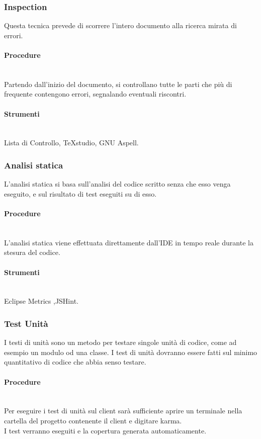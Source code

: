 \subsubsection{Inspection}
Questa tecnica prevede di scorrere l'intero documento alla ricerca mirata di errori.
\paragraph{Procedure} \hfill \\

Partendo dall'inizio del documento, si controllano tutte le parti che più di frequente contengono errori, segnalando eventuali riscontri.
\paragraph{Strumenti} \hfill \\

Lista di Controllo, TeXstudio, GNU Aspell.


\subsubsection{Analisi statica}
L'analisi statica si basa sull'analisi del codice scritto senza che esso venga eseguito, e sul risultato di test eseguiti su di esso.

\paragraph{Procedure} \hfill \\
L'analisi statica viene effettuata direttamente dall'IDE in tempo reale durante la stesura del codice.
\paragraph{Strumenti} \hfill \\
Eclipse Metrics ,JSHint.



\subsubsection{Test Unità}
I testi di unità sono un metodo per testare singole unità di codice, come ad esempio un modulo od una classe. I test di unità dovranno essere fatti sul minimo quantitativo di codice che abbia senso testare.

\paragraph{Procedure} \hfill \\
Per eseguire i test di unità sul client sarà sufficiente aprire un terminale nella cartella del progetto contenente il client e digitare karma.\\
I test verranno eseguiti e la copertura generata automaticamente.

